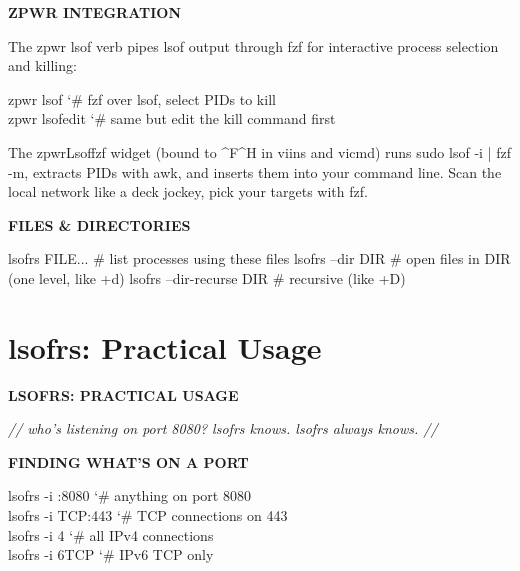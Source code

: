 \documentclass[11pt,a4paper,twoside]{book}
\begin{document}
\vspace{12pt}
{\bfseries\color{neonyellow} \textbf{ZPWR} INTEGRATION}\vspace{4pt}

The zpwr lsof verb pipes lsof output through fzf for interactive process selection and killing:

\begin{codebox}
\color{neongreen}zpwr lsof           {\char`\#} fzf over lsof, select PIDs to kill\\
\color{neongreen}zpwr lsofedit       {\char`\#} same but edit the kill command first\\
\end{codebox}

The zpwrLsoffzf widget (bound to \textasciicircum{}F\textasciicircum{}H in viins and vicmd) runs sudo lsof -i | fzf -m, extracts PIDs with awk, and inserts them into your command line. Scan the local network like a deck jockey, pick your targets with fzf.


\vspace{12pt}
{\bfseries\color{neonyellow} FILES \& DIRECTORIES}\vspace{4pt}

lsofrs FILE...      \# list processes using these files lsofrs --dir DIR    \# open files in DIR (one level, like +d) lsofrs --dir-recurse DIR \# recursive (like +D)


\vspace{16pt}

\section{lsofrs: Practical Usage}


\vspace{10pt}
{\large\bfseries\color{neoncyan} LSOFRS: PRACTICAL USAGE}\vspace{6pt}

{\small\itshape\color{dimtext} // who's listening on port 8080? lsofrs knows. lsofrs always knows. //}


\vspace{12pt}
{\bfseries\color{neonyellow} FINDING WHAT'S ON A PORT}\vspace{4pt}

\begin{codebox}
\color{neongreen}lsofrs -i :8080        {\char`\#} anything on port 8080\\
\color{neongreen}lsofrs -i TCP:443      {\char`\#} TCP connections on 443\\
\color{neongreen}lsofrs -i 4            {\char`\#} all IPv4 connections\\
\color{neongreen}lsofrs -i 6TCP         {\char`\#} IPv6 TCP only\\
\end{codebox}
\end{document}
